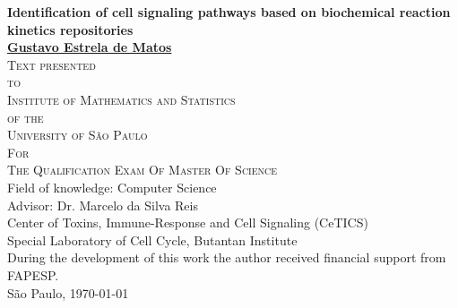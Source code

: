 \documentclass[12pt, twoside]{report}
\numberwithin{mydefinition}{section}
\numberwithin{mytheorem}{section}
\numberwithin{mylemma}{section}
\numberwithin{corollary}{section}
\begin{document}
\thispagestyle{empty}
\begin{center}
{\Large
{\bf Identification of cell signaling pathways based on biochemical 
    reaction kinetics repositories}\\
\bigskip
\bigskip
\bigskip
\bigskip
    {\bf \href{mailto:gustavo.estrela.matos@gmail.com}{Gustavo Estrela de Matos}}\\
\bigskip
\bigskip
\bigskip
\bigskip
\textsc{
    Text presented\\[-0.25cm] 
    to\\[-0.25cm]
    Institute of Mathematics and Statistics\\[-0.25cm]
    of the\\[-0.25cm]
    University of São Paulo\\[-0.25cm]
    For\\[-0.25cm]
    The Qualification Exam Of Master Of Science\\
    }
\bigskip
\bigskip
\bigskip
\bigskip
Field of knowledge: Computer Science\\
\bigskip
Advisor: Dr. Marcelo da Silva Reis\\
\bigskip
\bigskip
\bigskip
\bigskip
\bigskip
\bigskip
\bigskip
\bigskip
Center of Toxins, Immune-Response and Cell Signaling (CeTICS)\\
\bigskip
Special Laboratory of Cell Cycle, Butantan Institute\\
\bigskip
\bigskip
{\normalsize During the development of this work the author received 
    financial support from FAPESP.}\\
\bigskip
\bigskip
\bigskip
São Paulo, \today
}
\end{center}
\newpage
\end{document}
